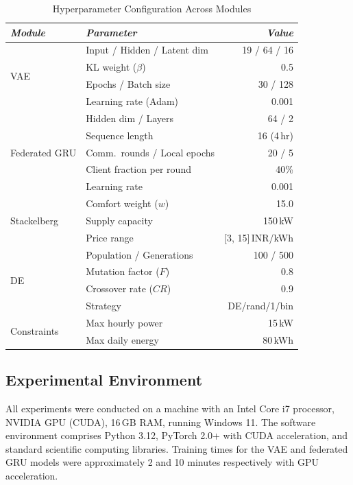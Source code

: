 \documentclass[journal]{IEEEtran}
\begin{document}
\begin{table}[H]
\centering
\caption{Hyperparameter Configuration Across Modules}
\label{tab:hyperparams}
\begin{tabular}{llr}
\toprule
\textit{Module} & \textit{Parameter} & \textit{Value} \\
\midrule
\multirow{4}{*}{VAE}
    & Input / Hidden / Latent dim & 19 / 64 / 16 \\
    & KL weight ($\beta$) & 0.5 \\
    & Epochs / Batch size & 30 / 128 \\
    & Learning rate (Adam) & 0.001 \\
\midrule
\multirow{5}{*}{Federated GRU}
    & Hidden dim / Layers & 64 / 2 \\
    & Sequence length & 16 (4\,hr) \\
    & Comm.\ rounds / Local epochs & 20 / 5 \\
    & Client fraction per round & 40\% \\
    & Learning rate & 0.001 \\
\midrule
\multirow{3}{*}{Stackelberg}
    & Comfort weight ($w$) & 15.0 \\
    & Supply capacity & 150\,kW \\
    & Price range & [3, 15]\,INR/kWh \\
\midrule
\multirow{4}{*}{DE}
    & Population / Generations & 100 / 500 \\
    & Mutation factor ($F$) & 0.8 \\
    & Crossover rate ($CR$) & 0.9 \\
    & Strategy & DE/rand/1/bin \\
\midrule
\multirow{2}{*}{Constraints}
    & Max hourly power & 15\,kW \\
    & Max daily energy & 80\,kWh \\
\bottomrule
\end{tabular}
\end{table}

\subsection{Experimental Environment}

All experiments were conducted on a machine with an Intel Core i7 processor, NVIDIA GPU (CUDA), 16\,GB RAM, running Windows 11. The software environment comprises Python 3.12, PyTorch 2.0+ with CUDA acceleration, and standard scientific computing libraries. Training times for the VAE and federated GRU models were approximately 2 and 10 minutes respectively with GPU acceleration.
\end{document}
